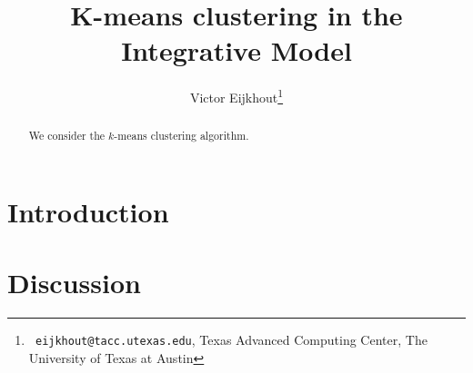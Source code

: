 \documentclass[11pt,fleqn,preprint]{impreport}
\title[K-kmeans in IMP]{K-means clustering in the Integrative Model}
\author[Eijkhout]{Victor Eijkhout\thanks{{\tt
      eijkhout@tacc.utexas.edu}, Texas Advanced Computing Center, The
    University of Texas at Austin}}
\begin{document}
\maketitle

\begin{abstract}
We consider the $k$-means clustering algorithm.
\end{abstract}

\section{Introduction}




\section{Discussion}



\end{document}
